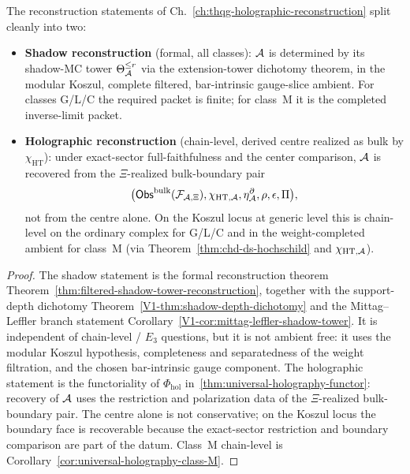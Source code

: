 \begin{proposition}
\label{prop:uhf-shadow-vs-holographic}
The reconstruction statements of
Ch.~\ref*{ch:thqg-holographic-reconstruction} split cleanly into
two:
\begin{itemize}
\item \textbf{Shadow reconstruction} \textup{(}formal, all
 classes\textup{)}: $\mathcal{A}$ is determined by its shadow-MC tower
 $\Theta_{\mathcal{A}}^{\leq r}$ via the extension-tower dichotomy
 theorem, in the modular Koszul, complete filtered, bar-intrinsic
 gauge-slice ambient. For classes G/L/C the required packet is finite;
 for class~M it is the completed inverse-limit packet.
\item \textbf{Holographic reconstruction} \textup{(}chain-level,
 derived centre realized as bulk by \(\chi_{\mathrm{HT}}\)\textup{)}:
 under exact-sector full-faithfulness and the center comparison,
 $\mathcal{A}$ is recovered from the $\Xi$-realized bulk-boundary pair
 \[
 \bigl(
 \mathsf{Obs}^{\mathrm{bulk}}(\mathcal{F}_{\mathcal{A},\Xi}),
 \chi_{\mathrm{HT},\mathcal{A}},
 \eta^\partial_{\mathcal{A}},\rho,\epsilon,\Pi
 \bigr),
 \]
 not from the centre alone. On the Koszul locus at generic level this is
 chain-level on the ordinary complex for G/L/C and in the
 weight-completed ambient for class~M \textup{(}via
 Theorem~\ref*{thm:chd-ds-hochschild} and
 \(\chi_{\mathrm{HT},\mathcal{A}}\)\textup{)}.
\end{itemize}
\end{proposition}

\begin{proof}
The shadow statement is the formal reconstruction theorem
Theorem~\ref*{thm:filtered-shadow-tower-reconstruction}, together
with the support-depth dichotomy
Theorem~\ref*{V1-thm:shadow-depth-dichotomy} and the
Mittag--Leffler branch statement
Corollary~\ref*{V1-cor:mittag-leffler-shadow-tower}. It is
independent of chain-level / $E_3$ questions, but it is not ambient
free: it uses the modular Koszul hypothesis, completeness and
separatedness of the weight filtration, and the chosen bar-intrinsic
gauge component. The holographic
statement is the functoriality of $\Phi_{\mathrm{hol}}$
in~\ref{thm:universal-holography-functor}: recovery of $\mathcal{A}$ uses the
restriction and polarization data of the \(\Xi\)-realized
bulk-boundary pair. The centre alone is not conservative; on the
Koszul locus the boundary face is recoverable because the
exact-sector restriction and boundary comparison are part of the
datum. Class~M chain-level is
Corollary~\ref*{cor:universal-holography-class-M}.
\end{proof}

